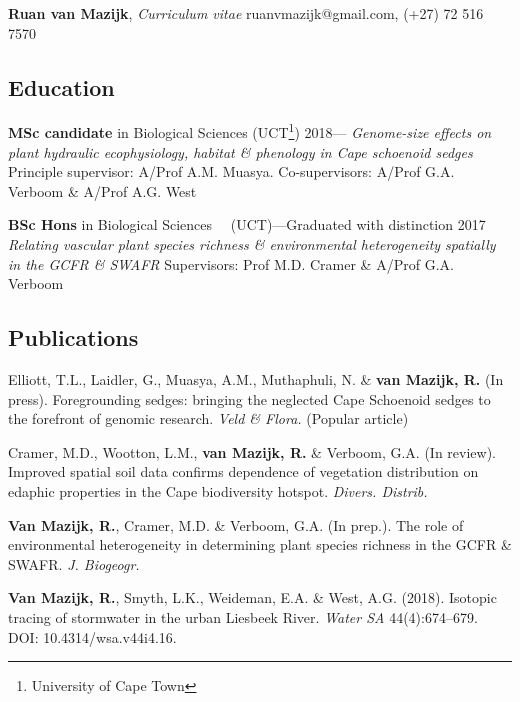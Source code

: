 \documentclass[10pt]{article}
\begin{document}
{\Large
\textbf{Ruan van Mazijk}, \textit{Curriculum vitae}
  \hfill ruanvmazijk@gmail.com, (+27) 72 516 7570
}

\hrulefill

\subsection*{Education} %

\begin{hangparas}{2em}{1}

\textbf{MSc candidate} in Biological Sciences
  (UCT\footnote{University of Cape Town})
  \hfill 2018--- \break
\textit{Genome-size effects on plant hydraulic ecophysiology, habitat \&
  phenology in Cape schoenoid sedges} \break
Principle supervisor: A/Prof A.M. Muasya. Co-supervisors: A/Prof G.A. Verboom
 \& A/Prof A.G. West

\textbf{BSc Hons} in Biological Sciences
  ~~(UCT)---Graduated with distinction
  \hfill 2017 \break
\textit{Relating vascular plant species richness \& environmental heterogeneity
  spatially in the GCFR \& SWAFR} \break
Supervisors: Prof M.D. Cramer \& A/Prof G.A. Verboom

\hfill

\end{hangparas}

\subsection*{Publications} %

\begin{hangparas}{2em}{1}

Elliott, T.L., Laidler, G., Muasya, A.M., Muthaphuli, N. \& \textbf{van Mazijk, 
R.} (In press). Foregrounding sedges: bringing the neglected Cape Schoenoid 
sedges to the forefront of genomic research. \textit{Veld \& Flora.} (Popular 
article)

Cramer, M.D., Wootton, L.M., \textbf{van Mazijk, R.} \& Verboom, G.A. (In 
review). Improved spatial soil data confirms dependence of vegetation 
distribution on edaphic properties in the Cape biodiversity hotspot. \textit{
Divers. Distrib.}

\textbf{Van Mazijk, R.}, Cramer, M.D. \& Verboom, G.A. (In prep.). The role of
environmental heterogeneity in determining plant species richness in the GCFR \&
SWAFR. \textit{J. Biogeogr.}

\textbf{Van Mazijk, R.}, Smyth, L.K., Weideman, E.A. \& West, A.G. (2018).
Isotopic tracing of stormwater in the urban Liesbeek River. \textit{Water SA}
44(4):674--679. DOI: 10.4314/wsa.v44i4.16.


\hfill

\end{hangparas}
\end{document}
